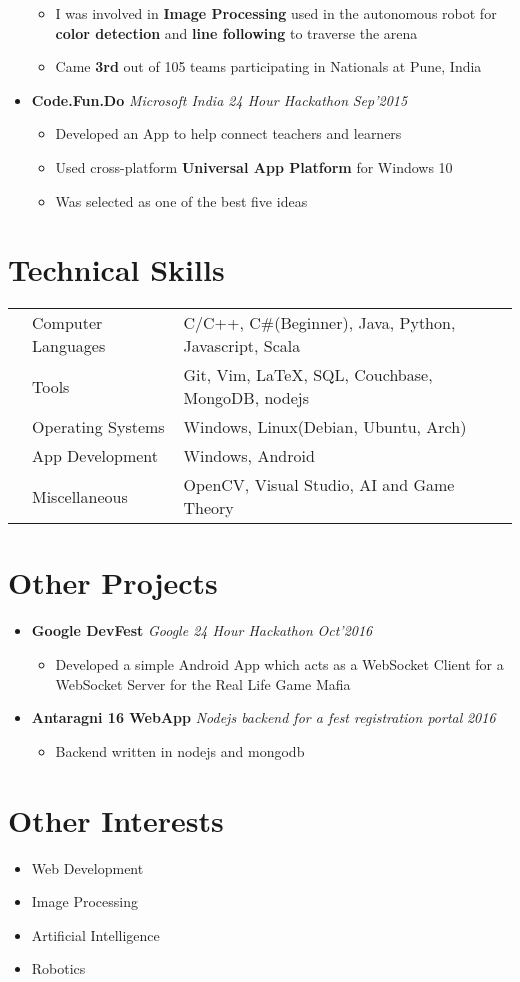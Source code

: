 \documentclass[11pt,a4paper]{moderncv}
\newcommand{\experience}[3]{
  \item \textbf{\large{#1}} \hfill \emph{#3} \hfill \textit{#2}
}
\begin{document}
\begin{itemize}
\begin{itemize}
        \item I was involved in \textbf{Image Processing} used in the autonomous robot for \textbf{color detection} and \textbf{line following} to traverse the arena
        \item Came \textbf{3rd} out of 105 teams participating in Nationals at Pune, India
      \end{itemize}
      \experience{Code.Fun.Do}{Sep'2015}{Microsoft India 24 Hour Hackathon}
      \begin{itemize}
        \item Developed an App to help connect teachers and learners
        \item Used cross-platform \textbf{Universal App Platform} for Windows 10
        \item Was selected as one of the best five ideas
      \end{itemize}
    \end{itemize}
  \section{Technical Skills}
  \begin{tabular}{L{0.05cm} L{6cm} l}
      & Computer Languages   & C/C++, C\#(Beginner), Java, Python, Javascript, Scala\\
      & Tools                & Git, Vim, \LaTeX, SQL, Couchbase, MongoDB, nodejs \\
      & Operating Systems    & Windows, Linux(Debian, Ubuntu, Arch)\\
      & App Development      & Windows, Android \\
      & Miscellaneous        & OpenCV, Visual Studio, AI and Game Theory
    \end{tabular}
  \section{Other Projects}
  \begin{itemize}
    \experience{Google DevFest}{Oct'2016}{Google 24 Hour Hackathon}
    \begin{itemize}
      \item Developed a simple Android App which acts as a WebSocket Client for a WebSocket Server for the Real Life Game Mafia
    \end{itemize}
    \experience{Antaragni 16 WebApp}{2016}{Nodejs backend for a fest registration portal}
    \begin{itemize}
      \item Backend written in nodejs and mongodb
    \end{itemize}
  \end{itemize}
  \section{Other Interests}
    \begin {itemize}
      \item Web Development
      \item Image Processing
      \item Artificial Intelligence
      \item Robotics
    \end{itemize}
\end{document}
